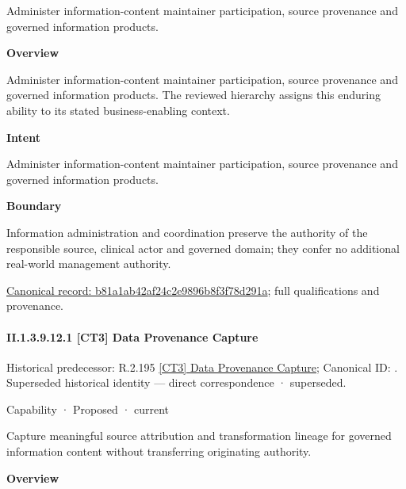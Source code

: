 Administer information-content maintainer participation, source provenance and governed information products.



\textbf{Overview}



Administer information-content maintainer participation, source provenance and governed information products. The reviewed hierarchy assigns this enduring ability to its stated business-enabling context.



\textbf{Intent}



Administer information-content maintainer participation, source provenance and governed information products.



\textbf{Boundary}



Information administration and coordination preserve the authority of the responsible source, clinical actor and governed domain; they confer no additional real-world management authority.


{\footnotesize \href{../../../../continuum/strategy/capability/b81a1ab42af24c2e9896b8f3f78d291a.md}{Canonical record: b81a1ab42af24c2e9896b8f3f78d291a}; full qualifications and provenance.}\par
\paragraph*{II.1.3.9.12.1 [CT3] Data Provenance Capture}
\label{navigation:II.1.3.9.12.1}

{\small Historical predecessor: R.2.195 \hyperref[element:61258c7fe41f4541871a67ec9d7185cf]{[CT3] Data Provenance Capture}; Canonical ID: \texttt{}. Superseded historical identity — direct correspondence · superseded.}\par
\label{element:44a7937520a54945b06b5fd4a2bbd870}
{\small Capability · Proposed · current}\par

Capture meaningful source attribution and transformation lineage for governed information content without transferring originating authority.



\textbf{Overview}



